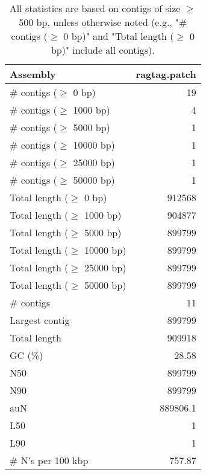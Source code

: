 \documentclass[12pt,a4paper]{article}
\begin{document}
\begin{table}[ht]
\begin{center}
\caption{All statistics are based on contigs of size $\geq$ 500 bp, unless otherwise noted (e.g., "\# contigs ($\geq$ 0 bp)" and "Total length ($\geq$ 0 bp)" include all contigs).}
\begin{tabular}{|l*{1}{|r}|}
\hline
Assembly & ragtag.patch \\ \hline
\# contigs ($\geq$ 0 bp) & 19 \\ \hline
\# contigs ($\geq$ 1000 bp) & 4 \\ \hline
\# contigs ($\geq$ 5000 bp) & 1 \\ \hline
\# contigs ($\geq$ 10000 bp) & 1 \\ \hline
\# contigs ($\geq$ 25000 bp) & 1 \\ \hline
\# contigs ($\geq$ 50000 bp) & 1 \\ \hline
Total length ($\geq$ 0 bp) & 912568 \\ \hline
Total length ($\geq$ 1000 bp) & 904877 \\ \hline
Total length ($\geq$ 5000 bp) & 899799 \\ \hline
Total length ($\geq$ 10000 bp) & 899799 \\ \hline
Total length ($\geq$ 25000 bp) & 899799 \\ \hline
Total length ($\geq$ 50000 bp) & 899799 \\ \hline
\# contigs & 11 \\ \hline
Largest contig & 899799 \\ \hline
Total length & 909918 \\ \hline
GC (\%) & 28.58 \\ \hline
N50 & 899799 \\ \hline
N90 & 899799 \\ \hline
auN & 889806.1 \\ \hline
L50 & 1 \\ \hline
L90 & 1 \\ \hline
\# N's per 100 kbp & 757.87 \\ \hline
\end{tabular}
\end{center}
\end{table}
\end{document}
